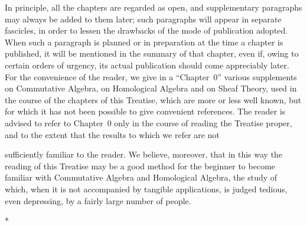 In principle, all the chapters are regarded as open, and supplementary paragraphs may always be added to them later; such paragraphs will appear in separate fascicles, in order to lessen the drawbacks of the mode of publication adopted.
When such a paragraph is planned or in preparation at the time a chapter is published, it will be mentioned in the summary of that chapter, even if, owing to certain orders of urgency, its actual publication should come appreciably later.
For the convenience of the reader, we give in a ``Chapter~0'' various supplements on Commutative Algebra, on Homological Algebra and on Sheaf Theory, used in the course of the chapters of this Treatise, which are more or less well known, but for which it has not been possible to give convenient references.
The reader is advised to refer to Chapter~0 only in the course of reading the Treatise proper, and to the extent that the results to which we refer are not

sufficiently familiar to the reader.
We believe, moreover, that in this way the reading of this Treatise may be a good method for the beginner to become familiar with Commutative Algebra and Homological Algebra, the study of which, when it is not accompanied by tangible applications, is judged tedious, even depressing, by a fairly large number of people.

\bigskip
\begin{center}*\quad*\quad*\end{center}
\bigskip

